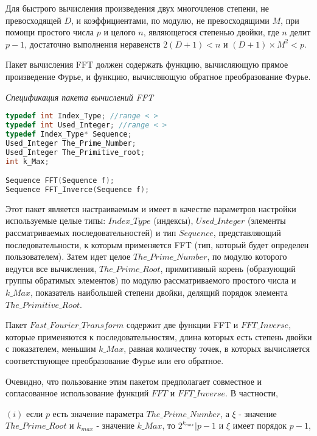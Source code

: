 \documentclass{mai_book}
\begin{document}
	Для быстрого вычисления произведения двух многочленов степени, не превосходящей $D$, и коэффициентами, по модулю, не превосходящими $M$, при помощи простого числа $p$ и целого $n$, являющегося степенью двойки, где $n$ делит $p-1$, достаточно выполнения неравенств $2(D+1) < n$ и $(D + 1) \times M^{2} < p$.
	
	\smallskip  
	
	Пакет вычисления FFT должен содержать функцию, вычисляющую прямое произведение Фурье, и функцию, вычисляющую обратное преобразование Фурье.
	\newpage
	
	\textit{Спецификация пакета вычислений FFT}
	
	\begin{lstlisting}[language=C,
basicstyle=\scriptsize,
linewidth=7cm,
belowskip=-1em,
mathescape=true]
typedef int Index_Type; //range < >
typedef int Used_Integer; //range < >
typedef Index_Type* Sequence;
Used_Integer The_Prime_Number;
Used_Integer The_Primitive_root;
int k_Max;

Sequence FFT(Sequence f);
Sequence FFT_Inverce(Sequence f);

\end{lstlisting}

\bigskip
	
	Этот пакет является настраиваемым и имеет в качестве параметров настройки используемые целые типы: $Index \_ Type$ (индексы), $Used \_ Integer$ (элементы рассматриваемых последовательностей) и тип $Sequence$, представляющий последовательности, к которым применяется FFT (тип, который будет определен пользователем). Затем идет целое $The \_ Prime \_ Number$, по модулю которого ведутся все вычисления, $The \_ Prime \_ Root$, примитивный корень (образующий группы обратимых элементов) по модулю рассматриваемого простого числа и $k \_ Max$, показатель наибольшей степени двойки, делящий порядок элемента $The \_ Primitive \_ Root$.
	
	Пакет $Fast \_ Fourier \_ Transform$ содержит две функции FFT и $FFT \_ Inverse$, которые применяются к последовательностям, длина которых есть степень двойки с показателем, меньшим $k \_ Max$, равная количеству точек, в которых вычисляется соответствующее преобразование Фурье или его обратное.
	
	Очевидно, что пользование этим пакетом предполагает совместное и согласованное использование функций $FFT$ и $FFT \_ Inverse$. В частности,
	
	$(i)$ если $p$ есть значение параметра $The \_ Prime \_ Number$, а $\xi$ - значение $The \_ Prime \_ Root$ и $k_{max}$ - значение $k \_ Max$, то $2^{k_{max}} | p - 1$ и $\xi$ имеет порядок $p-1$,
\end{document}
